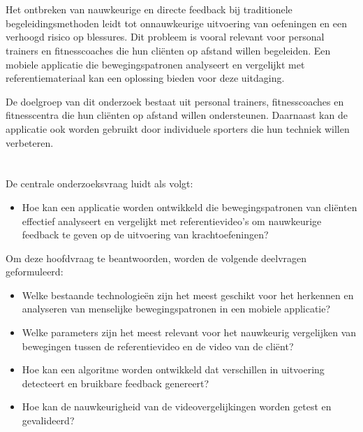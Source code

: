 \medskip

\section{}%
\label{sec:probleemstelling}

Het ontbreken van nauwkeurige en directe feedback bij traditionele begeleidingsmethoden leidt tot onnauwkeurige uitvoering van oefeningen en een verhoogd risico op blessures. Dit probleem is vooral relevant voor personal trainers en fitnesscoaches die hun cliënten op afstand willen begeleiden. Een mobiele applicatie die bewegingspatronen analyseert en vergelijkt met referentiemateriaal kan een oplossing bieden voor deze uitdaging.

\medskip

De doelgroep van dit onderzoek bestaat uit personal trainers, fitnesscoaches en fitnesscentra die hun cliënten op afstand willen ondersteunen. Daarnaast kan de applicatie ook worden gebruikt door individuele sporters die hun techniek willen verbeteren.

\section{}%
\label{sec:onderzoeksvraag}

De centrale onderzoeksvraag luidt als volgt:

\begin{itemize}
    \item Hoe kan een applicatie worden ontwikkeld die bewegingspatronen van \mbox{cliënten} effectief analyseert en vergelijkt met referentievideo’s om \mbox{nauwkeurige} feedback te geven op de uitvoering van krachtoefeningen?  
\end{itemize}

Om deze hoofdvraag te beantwoorden, worden de volgende deelvragen \mbox{geformuleerd}:

\begin{itemize}
    \item Welke bestaande technologieën zijn het meest geschikt voor het herkennen en analyseren van menselijke bewegingspatronen in een mobiele applicatie?
    \item Welke parameters zijn het meest relevant voor het nauwkeurig vergelijken van bewegingen tussen de referentievideo en de video van de cliënt?
    \item Hoe kan een algoritme worden ontwikkeld dat verschillen in uitvoering \mbox{detecteert} en bruikbare feedback genereert?
    \item Hoe kan de nauwkeurigheid van de videovergelijkingen worden getest en \mbox{gevalideerd}?
\end{itemize}

